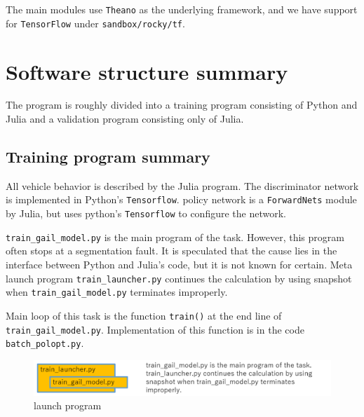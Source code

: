 The main modules use {\tt Theano} as the underlying framework, and we have support for {\tt TensorFlow} under {\tt sandbox/rocky/tf}.


\section{Software structure summary}

The program is roughly divided into a training program consisting of Python and Julia and a validation program consisting only of Julia.



\subsection{Training program summary}

All vehicle behavior is described by the Julia program. The discriminator network is implemented in Python's {\tt Tensorflow}.
policy network is a {\tt ForwardNets} module by Julia, but uses python's {\tt Tensorflow} to configure the network.


{\tt train\_gail\_model.py} is the main program of the task.
However, this program often stops at a segmentation fault. It is speculated that the cause lies in the interface between Python and Julia's code, but it is not known for certain.
Meta launch program {\tt train\_launcher.py} continues the calculation by using snapshot when {\tt train\_gail\_model.py} terminates improperly.

Main loop of this task is the function {\tt train()} at the end line of {\tt train\_gail\_model.py}.
Implementation of this function is in the code {\tt batch\_polopt.py}.




\begin{figure}[H]
\begin{center}
\includegraphics[width=16cm]{./figures/training_launch_program.png}
\caption{launch program}
\label{fig:training_launch}
\end{center}
\end{figure}






